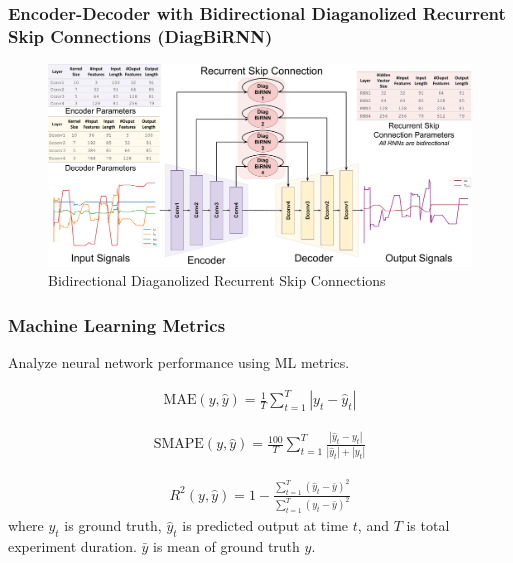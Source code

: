 \documentclass{beamer}
\begin{document}
\begin{frame}
\frametitle{Encoder-Decoder with Bidirectional Diaganolized Recurrent Skip Connections (DiagBiRNN)}

\begin{figure}[ht!]
    \centering
        \includegraphics[scale=0.17]{images/encoder_decoder.pdf}
    \caption{Bidirectional Diaganolized Recurrent Skip Connections}
    \label{fig:random}
    \vspace{-1em}
\end{figure}

\end{frame}


\begin{frame}
\frametitle{Machine Learning Metrics}
Analyze neural network performance using ML metrics.

\begin{align*}
    \text{MAE}(y, \hat{y}) = \frac{1}{T}\sum^{T}_{t=1}|y_t - \hat{y}_t|
\end{align*}

\begin{align*}
    \text{SMAPE}(y, \hat{y}) = \frac{100}{T} \sum_{t=1}^T \frac{|\hat{y}_t-y_t|}{|\hat{y}_t|+|y_t|}
\end{align*}

\begin{align*}
   R^2(y,\hat{y}) = 1 - \frac{\sum^{T}_{t=1}(\hat{y}_t - \bar{y})^2}{\sum^{T}_{t=1}(y_t - \bar{y})^2}
\end{align*}
where $y_t$ is ground truth, $\hat{y}_t$ is predicted output at time $t$, and $T$ is total experiment duration. $\bar{y}$ is mean of ground truth $y$.

\end{frame}
\end{document}
